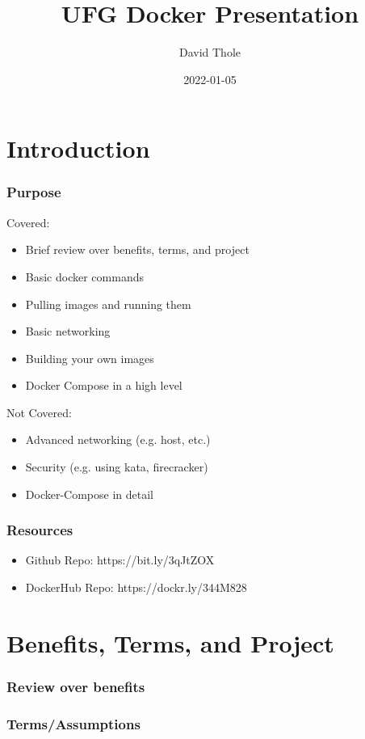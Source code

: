 \documentclass{beamer}
\begin{document}
\title{UFG Docker Presentation}
\author{David Thole}
\date{2022-01-05} 
\begin{frame}
  \titlepage
\end{frame}

\section{Introduction}
\begin{frame}\frametitle{Purpose}
  Covered:
  \begin{itemize}
    \item Brief review over benefits, terms, and project
    \item Basic docker commands
    \item Pulling images and running them
    \item Basic networking
    \item Building your own images
    \item Docker Compose in a high level
  \end{itemize}
  Not Covered:
  \begin{itemize}
    \item Advanced networking (e.g. host, etc.)
    \item Security (e.g. using kata, firecracker)
    \item Docker-Compose in detail
  \end{itemize}
\end{frame}
\begin{frame}\frametitle{Resources}
  \begin{itemize}
    \item Github Repo: https://bit.ly/3qJtZOX
    \item DockerHub Repo: https://dockr.ly/344M828
  \end{itemize}
\end{frame}

\section{Benefits, Terms, and Project}
\begin{frame}\frametitle{Review over benefits}
\end{frame}
\begin{frame}\frametitle{Terms/Assumptions}
\end{frame}
\end{document}
